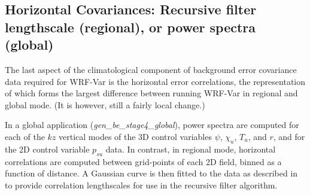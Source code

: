 \subsection{Horizontal Covariances: Recursive filter lengthscale (regional), or power 
spectra (global)}

The last aspect of the climatological component of background error
covariance data required for WRF-Var is the horizontal error
correlations, the representation of which forms the largest difference
between running WRF-Var in regional and global mode. (It is however,
still a fairly local change.)

In a global application ({\it gen\_be\_stage4\_global}), power spectra
are computed for each of the $kz$ vertical modes of the 3D control
variables $\psi$, $\chi_u$, $T_u$, and $r$, and for the 2D control
variable $p_{su}$ data. In contrast, in regional mode, horizontal
correlations are computed between grid-points of each 2D field, binned
as a function of distance. A Gaussian curve is then fitted to the data
as described in \citet{barker04} to provide correlation lengthscales
for use in the recursive filter algorithm.

